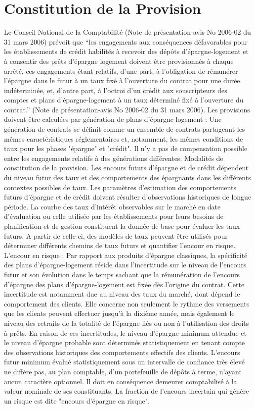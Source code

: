 \documentclass[12pt, a4paper]{book}
\begin{document}
{\section{Constitution de la Provision}
Le Conseil National de la Comptabilité (Note de présentation-avis No 2006-02 du 31 mars 2006) prévoit que “les engagements aux conséquences défavorables pour les établissements de crédit habilités à recevoir des dépôts d'épargne-logement et à consentir des prêts d'épargne logement doivent être provisionnés à chaque arrêté, ces engagements étant relatifs, d'une part, à l'obligation de rémunérer l'épargne dans le futur à un taux fixé à l'ouverture du contrat pour une durée indéterminée, et, d'autre part, à l'octroi d'un crédit aux souscripteurs des comptes et plans d'épargne-logement à un taux déterminé fixé à l'ouverture du contrat.” (Note de présentation-avis No 2006-02 du 31 mars 2006).
Les provisions doivent être calculées par génération de plans d'épargne logement : Une génération de contrats se définit comme un ensemble de contrats partageant les mêmes caractéristiques réglementaires et, notamment, les mêmes conditions de taux pour les phases "épargne" et "crédit". 
Il n'y a pas de compensation possible entre les engagements relatifs à des générations différentes.
Modalités de constitution de la provision.
Les encours futurs d'épargne et de crédit dépendent du niveau futur des taux et des comportements des épargnants dans les différents contextes possibles de taux. Les paramètres d'estimation des comportements futurs d'épargne et de crédit doivent résulter d'observations historiques de longue période.
La courbe des taux d'intérêt observables sur le marché en date d'évaluation ou celle utilisée par les établissements pour leurs besoins de planification et de gestion constituent la donnée de base pour évaluer les taux futurs. A partir de celle-ci, des modèles de taux peuvent être utilisés pour déterminer différents chemins de taux futurs et quantifier l'encour en risque.
L'encour en risque :  Par rapport aux produits d'épargne classiques, la spécificité des plans d'épargne-logement réside dans l'incertitude sur le niveau de l'encours futur et son évolution dans le temps sachant que la rémunération de l'encours d'épargne des plans d'épargne-logement est fixée dès l'origine du contrat.
Cette incertitude est notamment due au niveau des taux du marché, dont dépend le comportement des clients. Elle concerne non seulement le rythme des versements que les clients peuvent effectuer jusqu'à la dixième année, mais également le niveau des retraits de la totalité de l'épargne liés ou non à l'utilisation des droits à prêts.
En raison de ces incertitudes, le niveau d'épargne minimum attendue et le niveau d'épargne probable sont déterminés statistiquement en tenant compte des observations historiques des comportements effectifs des clients. L'encours futur minimum évalué statistiquement sous un intervalle de confiance très élevé ne diffère pas, au plan comptable, d'un portefeuille de dépôts à terme, n'ayant aucun caractère optionnel. Il doit en conséquence demeurer comptabilisé à la valeur nominale de ses constituants. La fraction de l'encours incertain qui génère un risque est dite "encours d'épargne en risque".






}
\end{document}
